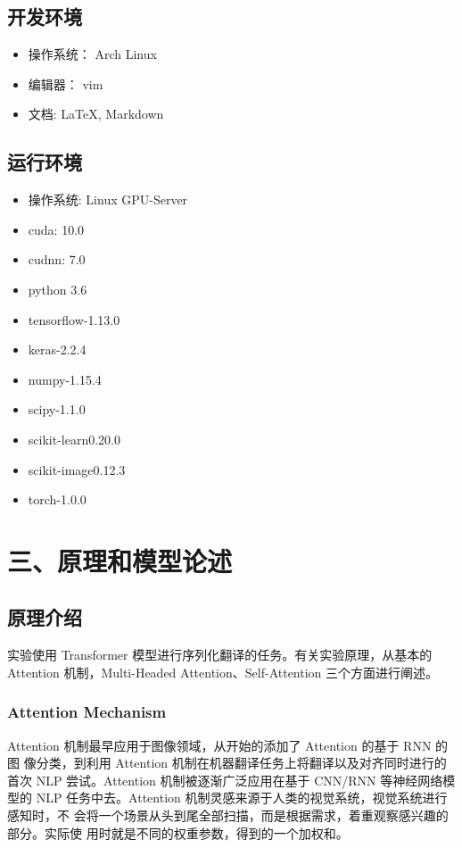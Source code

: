 \documentclass[UTF8,a4paper,10pt]{ctexart}
\begin{document}
\subsection{开发环境}
\begin{itemize}
  \item 操作系统： Arch Linux
  \item 编辑器：   vim
  \item 文档:     \LaTeX, Markdown
\end{itemize}

\subsection{运行环境}

\begin{itemize}
  \item 操作系统: Linux GPU-Server
  \item cuda: 10.0
  \item cudnn: 7.0
  \item python 3.6
  \item tensorflow-1.13.0
  \item keras-2.2.4
  \item numpy-1.15.4
  \item scipy-1.1.0
  \item scikit-learn0.20.0
  \item scikit-image0.12.3
  \item torch-1.0.0
\end{itemize}

\setcounter{section}{3}
\section*{三、原理和模型论述}

\setcounter{subsection}{0}
\subsection{原理介绍}
  实验使用 Transformer 模型进行序列化翻译的任务。有关实验原理，从基本的
Attention 机制，Multi-Headed Attention、Self-Attention 三个方面进行阐述。
\subsubsection{Attention Mechanism}
Attention 机制最早应用于图像领域，从开始的添加了 Attention 的基于 RNN 的图
像分类，到利用 Attention 机制在机器翻译任务上将翻译以及对齐同时进行的首次
NLP 尝试。Attention 机制被逐渐广泛应用在基于 CNN/RNN 等神经网络模型的 NLP
任务中去。Attention 机制灵感来源于人类的视觉系统，视觉系统进行感知时，不
会将一个场景从头到尾全部扫描，而是根据需求，着重观察感兴趣的部分。实际使
用时就是不同的权重参数，得到的一个加权和。
\end{document}
